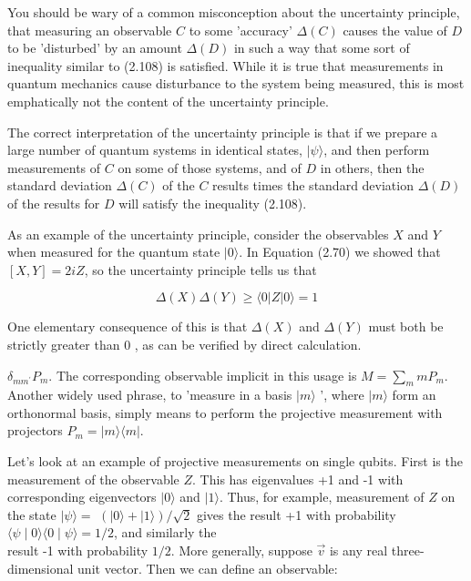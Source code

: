 \documentclass[10pt]{article}
\begin{document}
You should be wary of a common misconception about the uncertainty principle, that measuring an observable $C$ to some 'accuracy' $\Delta(C)$ causes the value of $D$ to be 'disturbed' by an amount $\Delta(D)$ in such a way that some sort of inequality similar to (2.108) is satisfied. While it is true that measurements in quantum mechanics cause disturbance to the system being measured, this is most emphatically not the content of the uncertainty principle.

The correct interpretation of the uncertainty principle is that if we prepare a large number of quantum systems in identical states, $|\psi\rangle$, and then perform measurements of $C$ on some of those systems, and of $D$ in others, then the standard deviation $\Delta(C)$ of the $C$ results times the standard deviation $\Delta(D)$ of the results for $D$ will satisfy the inequality (2.108).

As an example of the uncertainty principle, consider the observables $X$ and $Y$ when measured for the quantum state $|0\rangle$. In Equation (2.70) we showed that $[X, Y]=2 i Z$, so the uncertainty principle tells us that


\begin{equation*}
\Delta(X) \Delta(Y) \geq\langle 0|Z| 0\rangle=1 \tag{2.109}
\end{equation*}


One elementary consequence of this is that $\Delta(X)$ and $\Delta(Y)$ must both be strictly greater than 0 , as can be verified by direct calculation.

$\delta_{m m^{\prime}} P_{m}$. The corresponding observable implicit in this usage is $M=\sum_{m} m P_{m}$. Another widely used phrase, to 'measure in a basis $|m\rangle$ ', where $|m\rangle$ form an orthonormal basis, simply means to perform the projective measurement with projectors $P_{m}=|m\rangle\langle m|$.

Let's look at an example of projective measurements on single qubits. First is the measurement of the observable $Z$. This has eigenvalues +1 and -1 with corresponding eigenvectors $|0\rangle$ and $|1\rangle$. Thus, for example, measurement of $Z$ on the state $|\psi\rangle=$ $(|0\rangle+|1\rangle) / \sqrt{2}$ gives the result +1 with probability $\langle\psi \mid 0\rangle\langle 0 \mid \psi\rangle=1 / 2$, and similarly the\\
result -1 with probability $1 / 2$. More generally, suppose $\vec{v}$ is any real three-dimensional unit vector. Then we can define an observable:
\end{document}
